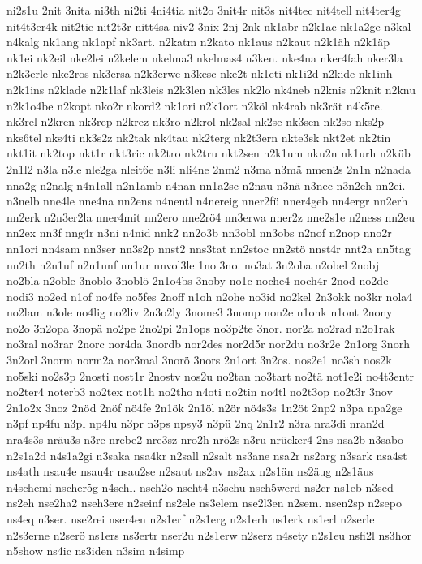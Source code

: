 {ni2s1u
2nit
3nita
ni3th
ni2ti
4ni4tia
nit2o
3nit4r
nit3s
nit4tec
nit4tell
nit4ter4g
nit4t3er4k
nit2tie
nit2t3r
nitt4sa
niv2
3nix
2nj
2nk
nk1abr
n2k1ac
nk1a2ge
n3kal
n4kalg
nk1ang
nk1apf
nk3art.
n2katm
n2kato
nk1aus
n2kaut
n2k1äh
n2k1äp
nk1ei
nk2eil
nke2lei
n2kelem
nkelma3
nkelmas4
n3ken.
nke4na
nker4fah
nker3la
n2k3erle
nke2ros
nk3ersa
n2k3erwe
n3kesc
nke2t
nk1eti
nk1i2d
n2kide
nk1inh
n2k1ins
n2klade
n2k1laf
nk3leis
n2k3len
nk3les
nk2lo
nk4neb
n2knis
n2knit
n2knu
n2k1o4be
n2kopt
nko2r
nkord2
nk1ori
n2k1ort
n2köl
nk4rab
nk3rät
n4k5re.
nk3rel
n2kren
nk3rep
n2krez
nk3ro
n2krol
nk2sal
nk2se
nk3sen
nk2so
nks2p
nks6tel
nks4ti
nk3s2z
nk2tak
nk4tau
nk2terg
nk2t3ern
nkte3sk
nkt2et
nk2tin
nkt1it
nk2top
nkt1r
nkt3ric
nk2tro
nk2tru
nkt2sen
n2k1um
nku2n
nk1urh
n2küb
2n1l2
n3la
n3le
nle2ga
nleit6e
n3li
nli4ne
2nm2
n3ma
n3mä
nmen2s
2n1n
n2nada
nna2g
n2nalg
n4n1all
n2n1amb
n4nan
nn1a2sc
n2nau
n3nä
n3nec
n3n2eh
nn2ei.
n3nelb
nne4le
nne4na
nn2ens
n4nentl
n4nereig
nner2fü
nner4geb
nn4ergr
nn2erh
nn2erk
n2n3er2la
nner4mit
nn2ero
nne2rö4
nn3erwa
nner2z
nne2s1e
n2ness
nn2eu
nn2ex
nn3f
nng4r
n3ni
n4nid
nnk2
nn2o3b
nn3obl
nn3obs
n2nof
n2nop
nno2r
nn1ori
nn4sam
nn3ser
nn3s2p
nnst2
nns3tat
nn2stoc
nn2stö
nnst4r
nnt2a
nn5tag
nn2th
n2n1uf
n2n1unf
nn1ur
nnvol3le
1no
3no.
no3at
3n2oba
n2obel
2nobj
no2bla
n2oble
3noblo
3noblö
2n1o4bs
3noby
no1c
noche4
noch4r
2nod
no2de
nodi3
no2ed
n1of
no4fe
no5fes
2noff
n1oh
n2ohe
no3id
no2kel
2n3okk
no3kr
nola4
no2lam
n3ole
no4lig
no2liv
2n3o2ly
3nome3
3nomp
non2e
n1onk
n1ont
2nony
no2o
3n2opa
3nopä
no2pe
2no2pi
2n1ops
no3p2te
3nor.
nor2a
no2rad
n2o1rak
no3ral
no3rar
2norc
nor4da
3nordb
nor2des
nor2d5r
nor2du
no3r2e
2n1org
3norh
3n2orl
3norm
norm2a
nor3mal
3norö
3nors
2n1ort
3n2os.
nos2e1
no3sh
nos2k
no5ski
no2s3p
2nosti
nost1r
2nostv
nos2u
no2tan
no3tart
no2tä
not1e2i
no4t3entr
no2ter4
noterb3
no2tex
not1h
no2tho
n4oti
no2tin
no4tl
no2t3op
no2t3r
3nov
2n1o2x
3noz
2nöd
2nöf
nö4fe
2n1ök
2n1öl
n2ör
nö4s3s
1n2öt
2np2
n3pa
npa2ge
n3pf
np4fu
n3pl
np4lu
n3pr
n3ps
npsy3
n3pü
2nq
2n1r2
n3ra
nra3di
nran2d
nra4s3s
nräu3s
n3re
nrebe2
nre3sz
nro2h
nrö2s
n3ru
nrücker4
2ns
nsa2b
n3sabo
n2s1a2d
n4s1a2gi
n3saka
nsa4kr
n2sall
n2salt
ns3ane
nsa2r
ns2arg
n3sark
nsa4st
ns4ath
nsau4e
nsau4r
nsau2se
n2saut
ns2av
ns2ax
n2s1än
ns2äug
n2s1äus
n4schemi
nscher5g
n4schl.
nsch2o
nscht4
n3schu
nsch5werd
ns2cr
ns1eb
n3sed
ns2eh
nse2ha2
nseh3ere
n2seinf
ns2ele
ns3elem
nse2l3en
n2sem.
nsen2sp
n2sepo
ns4eq
n3ser.
nse2rei
nser4en
n2s1erf
n2s1erg
n2s1erh
ns1erk
ns1erl
n2serle
n2s3erne
n2serö
ns1ers
ns3ertr
nser2u
n2s1erw
n2serz
n4sety
n2s1eu
nsfi2l
ns3hor
n5show
ns4ic
ns3iden
n3sim
n4simp
}

